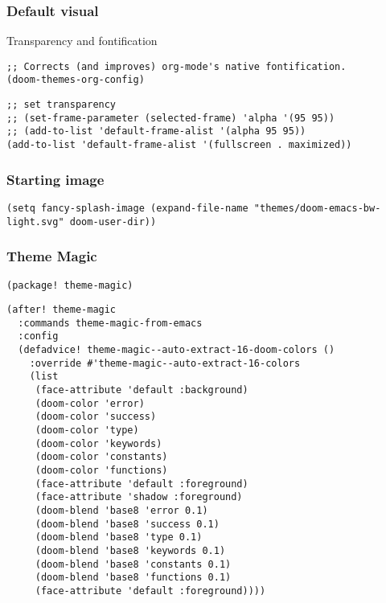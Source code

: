 \documentclass[c]{article}
\theoremstyle{plain}%
\theoremstyle{definition}
\theoremstyle{remark}
\begin{document}
\subsubsection{Default visual}
\label{sec:orgb20a1bc}
Transparency and fontification
\begin{verbatim}
;; Corrects (and improves) org-mode's native fontification.
(doom-themes-org-config)
\end{verbatim}
\begin{verbatim}
;; set transparency
;; (set-frame-parameter (selected-frame) 'alpha '(95 95))
;; (add-to-list 'default-frame-alist '(alpha 95 95))
(add-to-list 'default-frame-alist '(fullscreen . maximized))
\end{verbatim}
\subsubsection{Starting image}
\label{sec:org6459a12}
\begin{verbatim}
(setq fancy-splash-image (expand-file-name "themes/doom-emacs-bw-light.svg" doom-user-dir))
\end{verbatim}
\subsubsection{Theme Magic}
\label{sec:org6cbd3be}
\begin{verbatim}
(package! theme-magic)
\end{verbatim}
\begin{verbatim}
(after! theme-magic
  :commands theme-magic-from-emacs
  :config
  (defadvice! theme-magic--auto-extract-16-doom-colors ()
    :override #'theme-magic--auto-extract-16-colors
    (list
     (face-attribute 'default :background)
     (doom-color 'error)
     (doom-color 'success)
     (doom-color 'type)
     (doom-color 'keywords)
     (doom-color 'constants)
     (doom-color 'functions)
     (face-attribute 'default :foreground)
     (face-attribute 'shadow :foreground)
     (doom-blend 'base8 'error 0.1)
     (doom-blend 'base8 'success 0.1)
     (doom-blend 'base8 'type 0.1)
     (doom-blend 'base8 'keywords 0.1)
     (doom-blend 'base8 'constants 0.1)
     (doom-blend 'base8 'functions 0.1)
     (face-attribute 'default :foreground))))

\end{verbatim}
\end{document}
